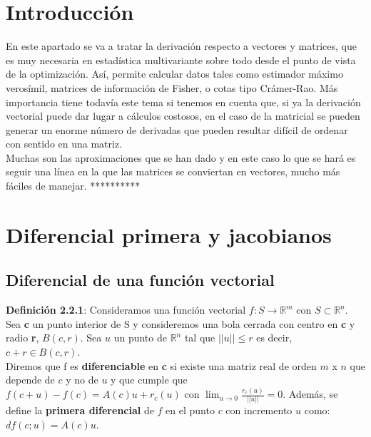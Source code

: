 \documentclass{article}
\theoremstyle{theorem-style}  %
\theoremstyle{definition}
\theoremstyle{example-style}
\begin{document}
 \maketitle



\newpage
\tableofcontents
\newpage

\section{Introducción}

En este apartado se va a tratar la derivación respecto a vectores y matrices, que es muy necesaria en estadística multivariante sobre todo desde el punto de vista de la optimización. Así, permite calcular datos tales como estimador máximo verosímil, matrices de información de Fisher, o cotas tipo Crámer-Rao. Más importancia tiene todavía este tema si tenemos en cuenta que, si ya la derivación vectorial puede dar lugar a cálculos costosos, en el caso de la matricial se pueden generar un enorme número de derivadas que pueden resultar difícil de ordenar con sentido en una matriz. \\

Muchas son las aproximaciones que se han dado y en este caso lo que se hará es seguir una línea en la que las matrices se conviertan en vectores, mucho más fáciles de manejar. **********

\section{Diferencial primera y jacobianos}

\subsection{Diferencial de una función vectorial}
\textbf{Definición 2.2.1}: Consideramos una función vectorial $f: S \rightarrow \mathbb{R}^m$ con $S\subset \mathbb{R}^n$. Sea \textbf{c} un punto interior de S y consideremos una bola cerrada con centro en \textbf{c} y radio \textbf{r}, $B(c,r)$. Sea $u$ un punto de $\mathbb{R}^n$ tal que $||u||\leq r$ es decir, $c+r \in B(c,r)$. \\
Diremos que f es \textbf{diferenciable} en \textbf{c} si existe una matriz real de orden $m$ x $n$ que depende de $c$ y no de $u$ y que cumple que $f(c+u)-f(c) = A(c)u + r_c(u)$ con $\lim_{u\to0} \frac{r_c(u)}{||u||} = 0$. Además, se define la \textbf{primera diferencial} de $f$ en el punto $c$ con incremento $u$ como: $df(c;u)=A(c)u$.\\
\end{document}

